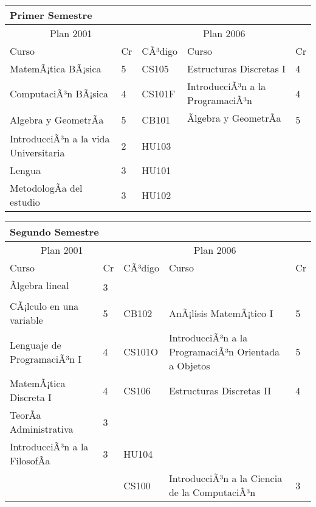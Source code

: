 \begin{center}
\begin{tabularx}{0.95\textwidth}{|p{4cm}|p{1cm}||p{2cm}|X|p{1cm}|}\hline
\multicolumn{5}{|l|}{\textbf{Primer Semestre}} \\ \hline
\multicolumn{2}{|c|}{Plan 2001} & \multicolumn{3}{|c|}{Plan 2006} \\ \hline
Curso & Cr & CÃ³digo & Curso & Cr \\ \hline
MatemÃ¡tica BÃ¡sica & 5 & CS105 & Estructuras Discretas I & 4 \\ \hline
ComputaciÃ³n BÃ¡sica & 4 & CS101F & IntroducciÃ³n a la ProgramaciÃ³n & 4 \\ \hline
Algebra y GeometrÃ­a & 5 & CB101 & Ãlgebra y GeometrÃ­a & 5 \\ \hline
IntroducciÃ³n a la vida Universitaria & 2 & HU103 &  & \\ \hline
Lengua & 3 & HU101 &  & \\ \hline
MetodologÃ­a del estudio & 3 & HU102 &  & \\ \hline
\end{tabularx}
\end{center}

\begin{center}
\begin{tabularx}{0.95\textwidth}{|p{4cm}|p{1cm}||p{2cm}|X|p{1cm}|}\hline
\multicolumn{5}{|l|}{\textbf{Segundo Semestre}} \\ \hline
\multicolumn{2}{|c|}{Plan 2001} & \multicolumn{3}{|c|}{Plan 2006} \\ \hline
Curso & Cr & CÃ³digo & Curso & Cr \\ \hline
Ãlgebra lineal & 3 &  &  & \\ \hline
CÃ¡lculo en una variable & 5 & CB102 & AnÃ¡lisis MatemÃ¡tico I & 5 \\ \hline
Lenguaje de ProgramaciÃ³n I & 4 & CS101O & IntroducciÃ³n a la ProgramaciÃ³n Orientada a Objetos & 5 \\ \hline
MatemÃ¡tica Discreta I & 4 & CS106 & Estructuras Discretas II & 4 \\ \hline
TeorÃ­a Administrativa & 3 &  &  & \\ \hline
IntroducciÃ³n a la FilosofÃ­a & 3 & HU104 &  & \\ \hline
 &  & CS100 & IntroducciÃ³n a la Ciencia de la ComputaciÃ³n & 3 \\ \hline
\end{tabularx}
\end{center}

